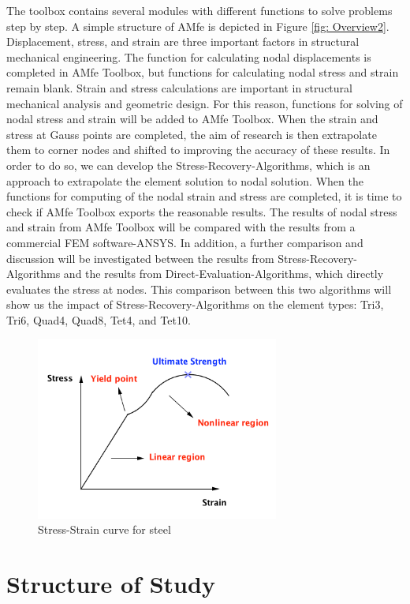 The toolbox contains several modules with different functions to solve problems step by step. A simple structure of AMfe is depicted in Figure \ref{fig: Overview2}. Displacement, stress, and strain are three important factors in structural mechanical engineering. The function for calculating nodal displacements is completed in AMfe Toolbox, but functions for calculating nodal stress and strain remain blank. Strain and stress calculations are important in structural mechanical analysis and geometric design. For this reason, functions for solving of nodal stress and strain will be added to AMfe Toolbox. When the strain and stress at Gauss points are completed, the aim of research is then extrapolate them to corner nodes and  shifted to improving the accuracy of these results. In order to do so, we can develop the Stress-Recovery-Algorithms, which is an approach to extrapolate the element solution to nodal solution. When the functions for computing of the nodal strain and stress are completed, it is time to check if AMfe Toolbox exports the reasonable results. The results of nodal stress and strain from AMfe Toolbox will be compared with the results from a commercial FEM software-ANSYS. In addition, a further comparison and discussion will be investigated between the results from Stress-Recovery-Algorithms and the results from Direct-Evaluation-Algorithms, which directly evaluates the stress at nodes. This comparison between this two algorithms will show us the impact of Stress-Recovery-Algorithms on the element types: Tri3, Tri6, Quad4, Quad8, Tet4, and Tet10.


\begin{figure}
	\begin{center}
		\includegraphics[width=8cm,clip]{nonlinear.pdf}			
		\caption{Stress-Strain curve for steel} \label{fig: nonlinear}
	\end{center}
\end{figure}

\section{Structure of Study}

